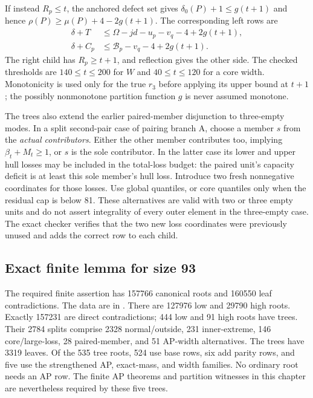 \documentclass[11pt,a4paper]{article}
\theoremstyle{remark}
\begin{document}
If instead $R_p\le t$, the anchored defect set gives
$\delta_0(P)+1\le g(t+1)$ and hence
$\rho(P)\ge\mu(P)+4-2g(t+1)$. The corresponding left rows are
\begin{align*}
 \delta+T&\le\Omega-jd-u_p-v_q-4+2g(t+1),\\
 \delta+C_p&\le\mathcal B_p-v_q-4+2g(t+1).
\end{align*}
The right child has $R_p\ge t+1$, and reflection gives the other side.
The checked thresholds are $140\le t\le200$ for $W$ and
$40\le t\le120$ for a core width. Monotonicity is used only for the
true $r_3$ before applying its upper bound at $t+1$; the possibly
nonmonotone partition function $g$ is never assumed monotone.

The trees also extend the earlier paired-member disjunction to
three-empty modes. In a split second-pair case of pairing branch A,
choose a member $s$ from the \emph{actual contributors}. Either the
other member contributes too, implying $\beta_t+M_t\ge1$, or $s$ is
the sole contributor. In the latter case its lower and upper hull
losses may be included in the total-loss budget: the paired unit's
capacity deficit is at least this sole member's hull loss. Introduce
two fresh nonnegative coordinates for those losses. Use global quantiles,
or core quantiles only when the residual cap is below 81. These
alternatives are valid with two or three empty units and do not assert
integrality of every outer element in the three-empty case. The exact
checker verifies that the two new loss coordinates were previously
unused and adds the correct row to each child.


\subsection{Exact finite lemma for size 93}
\label{u86:finite:93}
The required finite assertion has 157766 canonical roots and 160550
leaf contradictions. The data are in .
There are 127976 low and 29790 high roots. Exactly 157231 are direct
contradictions; 444 low and 91 high roots have trees. Their 2784 splits
comprise 2328 normal/outside, 231 inner-extreme, 146 core/large-loss,
28 paired-member, and 51 AP-width alternatives. The trees have 3319
leaves. Of the 535 tree roots, 524 use base rows, six add parity rows,
and five use the strengthened AP, exact-mass, and width families.
No ordinary root needs an AP row. The finite AP theorems and partition
witnesses in this chapter are nevertheless required by these five trees.
\end{document}
